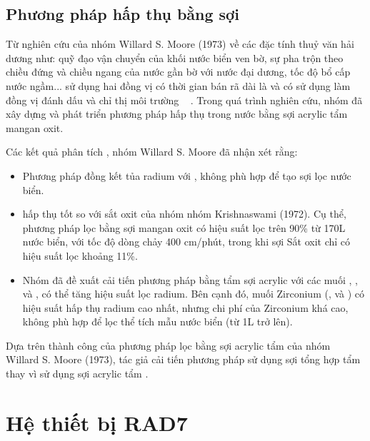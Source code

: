     \subsection{Phương pháp hấp thụ  bằng sợi }

      Từ nghiên cứu của nhóm  Willard S. Moore (1973) về các đặc tính thuỷ văn hải dương như: quỹ đạo vận chuyển của khối nước biển ven bờ, sự pha trộn theo chiều đứng và chiều ngang của nước gần bờ với nước đại dương, tốc độ bổ cấp nước ngầm... sử dụng  hai đồng vị có thời gian bán rã dài là  và  có sử dụng làm  đồng vị đánh dấu và chỉ thị môi trường ~\cite{MnO2:Moore} . Trong quá trình nghiên cứu, nhóm đã xây dựng và phát triển phương pháp hấp thụ  trong nước bằng sợi acrylic tẩm mangan oxit.
      
      Các kết quả phân tích , nhóm Willard S. Moore đã nhận xét rằng: 
      \begin{itemize}
        \item Phương pháp đồng kết tủa radium với , không phù hợp để tạo sợi lọc nước biển. 
        \item {} hấp thụ  tốt so với sắt oxit của nhóm nhóm Krishnaswami (1972). Cụ thể, phương pháp lọc bằng sợi mangan oxit có hiệu suất lọc  trên 90\% từ 170L nước biển, với tốc độ dòng chảy 400 cm/phút, trong khi sợi Sắt oxit chỉ có hiệu suất lọc khoảng 11\%.
        \item  Nhóm đã đề xuất cải tiến phương pháp bằng tẩm sợi acrylic với các muối , , và , có thể tăng hiệu suất lọc radium. Bên cạnh đó, muối Zirconium (\ce{[OH]^-},  và   ) có hiệu suất hấp thụ radium cao nhất, nhưng chi phí của Zirconium khá cao, không phù hợp để lọc thể tích mẫu nước biển (từ 1L trở lên). 
    \end{itemize}
    
    Dựa trên thành công của phương pháp lọc  bằng sợi acrylic tẩm  của nhóm Willard S. Moore (1973), tác giả  cải tiến  phương pháp sử dụng sợi tổng hợp tẩm    thay vì sử dụng sợi acrylic tẩm . 





\section{Hệ thiết bị RAD7}
\label{section:HeThietBiRAD7}

